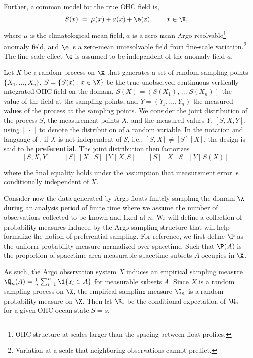 Further, a common model for the true OHC field is, 
\begin{equation}
  \label{eq:fieldmodel} 
  S(x) \;=\; \mu(x) + a(x) + \e(x), \qquad x \in \X,
\end{equation}
where $\mu$ is the climatological mean field, $a$ is a zero-mean Argo resolvable\footnote{OHC structure at scales larger than the spacing between float profiles.} anomaly field, and $\e$ is a zero-mean unresolvable field from fine-scale variation.\footnote{Variation at a scale that neighboring observations cannot predict.} The fine-scale effect $\e$ is assumed to be independent of the anomaly field $a$.

Let $X$ be a random process on $\X$ that generates a set of random sampling points $\{X_1,\dots,X_n\}$,
$S = \{S(x): x \in \X\}$ be the true unobserved continuous vertically integrated OHC field on the domain, $S(X) = (S(X_1),\ldots,S(X_n))$ the value of the field at the sampling points, and $Y=(Y_1,\ldots,Y_n)$ the measured values of the process at the sampling points.
We consider the joint distribution of the process $S$, the measurement points $X$, and the measured values $Y$, $[S, X, Y]$, using $[\,\cdot\,]$ to denote the distribution of a random variable.
In the notation and language of \cite{diggle2010}, if $X$ is not independent of $S$, i.e., $[S,X] \ne [S][X]$, the design is said to be \textbf{preferential}.
The joint distribution then factorizes 
\begin{equation}
  \label{eq:preffac}
  [S, X, Y] \;=\; [S]\,[X \mid S]\,[Y \mid X, S] \;=\; [S]\,[X \mid S]\,[Y \mid S(X)].
\end{equation}

where the final equality holds under the assumption that measurement error is conditionally independent of $X$.

Consider now the data generated by Argo floats finitely sampling the domain $\X$ during an analysis period of finite time where we assume the number of observations collected to be known and fixed at $n$.
We will define a collection of probability measures induced by the Argo sampling structure that will help formalize the notion of preferential sampling.
For reference, we first define $\P$ as the uniform probability measure normalized over spacetime. Such that $\P(A)$ is the proportion of spacetime area measurable spacetime subsets $A$ occupies in $\X$.

As such, the Argo observation system  $X$ induces an empirical sampling measure $\Q_n(A) = \frac1n\sum_{i=1}^n\1\{x_i \in A\}$ for measurable  subsets $A$.
Since $X$ is a random sampling process on $\X$, the empirical sampling measure $\Q_n$ is a random probability measure on $\X$.
Then let $\R_s$ be the conditional expectation of $\Q_n$ for a given OHC ocean state $S = s$. 

